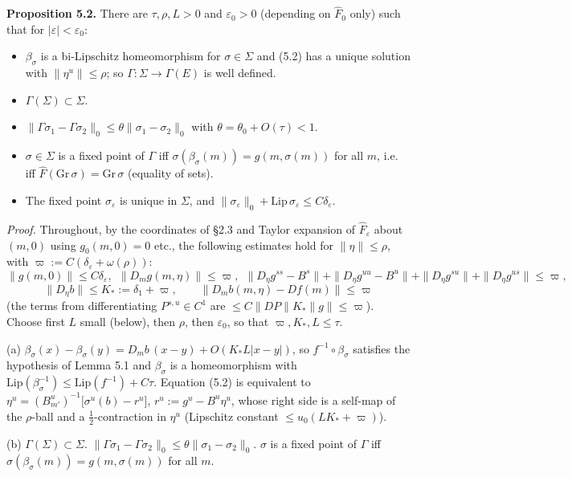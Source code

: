 \documentclass[11pt,a4paper]{article}
\theoremstyle{plain}
\theoremstyle{definition}
\theoremstyle{remark}
\numberwithin{equation}{section}
\numberwithin{figure}{section}
\begin{document}
\textbf{Proposition 5.2.} There are $\tau,\rho,L>0$ and $\varepsilon_0>0$ (depending on $\widehat F_0$ only) such that for $|\varepsilon|<\varepsilon_0$:
\begin{itemize}
    \item[(a)] $\beta_\sigma$ is a bi-Lipschitz homeomorphism for $\sigma\in\Sigma$ and (5.2) has a unique solution with $\|\eta^u\|\le\rho$; so $\Gamma:\Sigma\to\Gamma(E)$ is well defined.
    \item[(b)] $\Gamma(\Sigma)\subset\Sigma$.
    \item[(c)] $\|\Gamma\sigma_1-\Gamma\sigma_2\|_0\le\theta\|\sigma_1-\sigma_2\|_0$ with $\theta=\theta_0+O(\tau)<1$.
    \item[(d)] $\sigma\in\Sigma$ is a fixed point of $\Gamma$ iff $\sigma(\beta_\sigma(m))=g(m,\sigma(m))$ for all $m$, i.e. iff $\widehat F(\mathrm{Gr}\,\sigma)=\mathrm{Gr}\,\sigma$ (equality of sets).
    \item[(e)] The fixed point $\sigma_\varepsilon$ is unique in $\Sigma$, and $\|\sigma_\varepsilon\|_0+\mathrm{Lip}\,\sigma_\varepsilon\le C\delta_\varepsilon$.
\end{itemize}

\textit{Proof.} Throughout, by the coordinates of §2.3 and Taylor expansion of $\widehat F_\varepsilon$ about $(m,0)$ using $g_0(m,0)=0$ etc., the following estimates hold for $\|\eta\|\le\rho$, with $\varpi:=C(\delta_\varepsilon+\omega(\rho))$:
\[
\|g(m,0)\|\le C\delta_\varepsilon,\ \ \|D_mg(m,\eta)\|\le\varpi,\ \ \|D_\eta g^{ss}-B^s\|+\|D_\eta g^{uu}-B^u\|+\|D_\eta g^{su}\|+\|D_\eta g^{us}\|\le\varpi,
\]
\[
\|D_\eta b\|\le K_*:=\delta_1+\varpi,\qquad\|D_mb(m,\eta)-Df(m)\|\le\varpi
\]
(the terms from differentiating $P^{s,u}\in C^1$ are $\le C\|DP\|K_*\|g\|\le\varpi$). Choose first $L$ small (below), then $\rho$, then $\varepsilon_0$, so that $\varpi,K_*,L\le\tau$.

(a) $\beta_\sigma(x)-\beta_\sigma(y)=D_mb\,(x-y)+O(K_*L|x-y|)$, so $f^{-1}\circ\beta_\sigma$ satisfies the hypothesis of Lemma 5.1 and $\beta_\sigma$ is a homeomorphism with $\mathrm{Lip}(\beta_\sigma^{-1})\le\mathrm{Lip}(f^{-1})+C\tau$. Equation (5.2) is equivalent to $\eta^u=(B^u_{m'})^{-1}\big[\sigma^u(b)-r^u\big]$, $r^u:=g^u-B^u\eta^u$, whose right side is a self-map of the $\rho$-ball and a $\tfrac12$-contraction in $\eta^u$ (Lipschitz constant $\le u_0(LK_*+\varpi)$).

(b) $\Gamma(\Sigma)\subset\Sigma$. $\|\Gamma\sigma_1-\Gamma\sigma_2\|_0\le\theta\|\sigma_1-\sigma_2\|_0$. $\sigma$ is a fixed point of $\Gamma$ iff $\sigma(\beta_\sigma(m))=g(m,\sigma(m))$ for all $m$.
\end{document}

